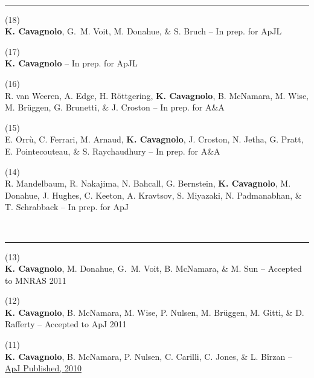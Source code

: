\documentclass[12pt]{cv}
\begin{document}
{\large{}}\vspace{-0.3cm}\\
\rule{\linewidth}{0.5pt}
(18) {}\\
{\bf K. Cavagnolo}, G.~M. Voit, M. Donahue, \& S. Bruch -- 
In prep. for ApJL

(17) {}\\
{\bf K. Cavagnolo} -- 
In prep. for ApJL

(16) {}\\
R. van Weeren, A. Edge, H. R\"ottgering, {\bf{K. Cavagnolo}}, B. McNamara, M. Wise, M. Br\"uggen, G. Brunetti, \& J. Croston -- 
In prep. for A\&A

(15) {}\\
E. Orr\`u, C. Ferrari, M. Arnaud, {\bf K. Cavagnolo}, J. Croston, N. Jetha, G. Pratt, E. Pointecouteau, \& S. Raychaudhury -- 
In prep. for A\&A

(14) {}\\
R. Mandelbaum, R. Nakajima, N. Bahcall, G. Bernstein, {\bf K. Cavagnolo}, M. Donahue, J. Hughes, C. Keeton, A. Kravtsov, S. Miyazaki, N. Padmanabhan, \& T. Schrabback -- 
In prep. for ApJ

{\large{}}\vspace{-0.3cm}\\
\rule{\linewidth}{0.5pt}
(13) {}\\
{\bf K. Cavagnolo}, M. Donahue, G.~M. Voit, B. McNamara, \& M. Sun --
Accepted to MNRAS 2011

(12) {}\\
{\bf K. Cavagnolo}, B. McNamara, M. Wise, P. Nulsen, M. Br\"uggen, M. Gitti, \& D. Rafferty -- 
Accepted to ApJ 2011

(11) {}\\
{\bf K. Cavagnolo}, B. McNamara, P. Nulsen, C. Carilli, C. Jones, \& L. B\^irzan -- 
\href{http://adsabs.harvard.edu/abs/2010ApJ...720.1066C}{ApJ Published, 2010}
\end{document}
